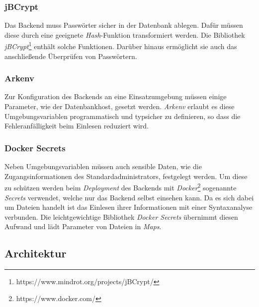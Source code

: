 \documentclass[a4paper, 11pt]{article}
\begin{document}
\subsubsection{jBCrypt}
\label{subsubsec:backend:bibs:jbcrypt}

Das Backend muss Passwörter sicher in der Datenbank ablegen.
Dafür müssen diese durch eine geeignete \textit{Hash}-Funktion transformiert werden.
Die Bibliothek \textit{jBCrypt}\footnote{https://www.mindrot.org/projects/jBCrypt/} enthält solche Funktionen.
Darüber hinaus ermöglicht sie auch das anschließende Überprüfen von Passwörtern.

\subsubsection{Arkenv}
\label{subsubsec:backend:bibs:arkenv}

Zur Konfiguration des Backends an eine Einsatzumgebung müssen einige Parameter, wie der Datenbankhost, gesetzt werden.
\textit{Arkenv} erlaubt es diese Umgebungsvariablen programmatisch und typsicher zu definieren, so dass die Fehleranfälligkeit beim Einlesen reduziert wird.

\subsubsection{Docker Secrets}
\label{subsubsec:backend:bibs:dockersecrets}

Neben Umgebungsvariablen müssen auch sensible Daten, wie die Zugangsinformationen des Standardadministrators, festgelegt werden.
Um diese zu schützen werden beim \textit{Deployment} des Backends mit \textit{Docker}\footnote{https://www.docker.com/} sogenannte \textit{Secrets} verwendet, welche nur das Backend selbst einsehen kann.
Da es sich dabei um Dateien handelt ist das Einlesen ihrer Informationen mit einer Syntaxanalyse verbunden.
Die leichtgewichtige Bibliothek \textit{Docker Secrets} übernimmt diesen Aufwand und lädt Parameter von Dateien in \textit{Maps}.

\subsection{Architektur}
\label{subsec:backend:architecture}
\end{document}
